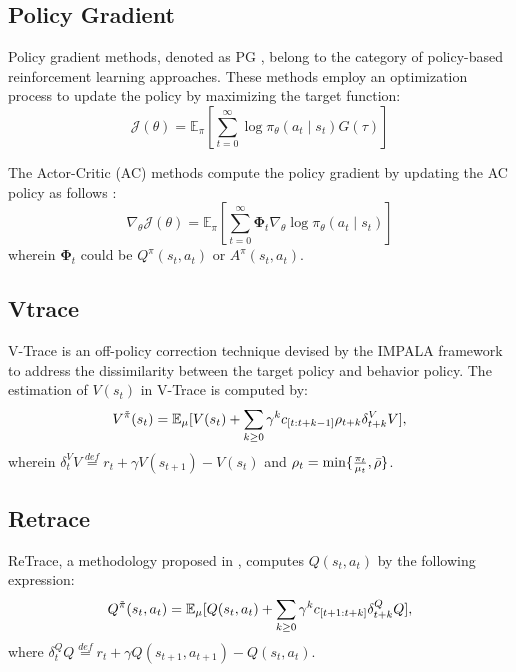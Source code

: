 \subsection{Policy Gradient}
\label{app: pg}

Policy gradient methods, denoted as PG \citep{williams1992simple,casa,entropy}, belong to the category of policy-based reinforcement learning approaches. These methods employ an optimization process to update the policy by maximizing the target function:
\begin{equation*}
    \mathcal{J} (\theta)=\mathbb{E}_{\pi}\left[\sum_{t=0}^{\infty} \log \pi_{\theta}\left(a_{t} \mid s_{t}\right) G(\tau)\right]
\end{equation*}


The Actor-Critic (AC) methods compute the policy gradient by updating the AC policy as follows \citep{sutton}:
\begin{equation*}
    \nabla_{\theta} \mathcal{J}(\theta)=\mathbb{E}_{\pi}\left[\sum_{t=0}^{\infty} \bm{\Phi}_{t} \nabla_{\theta} \log \pi_{\theta}\left(a_{t} \mid s_{t}\right)\right]
\end{equation*}
wherein $\bm{\Phi}_{t}$ could be  $Q^{\pi}\left(s_{t}, a_{t}\right)$ or $A^{\pi}\left(s_{t}, a_{t}\right)$. 

\subsection{Vtrace}
\label{app: vtrace}
V-Trace is an off-policy correction technique devised by the IMPALA framework \citep{impala} to address the dissimilarity between the target policy and behavior policy. The estimation of $V(s_t)$ in V-Trace is computed by:
\begin{equation*}
\label{Equ: vtrace}
    V^{\Tilde{\pi}} (s_t) 
        = \mathbb{E}_{\mu} [ 
        V(s_t) + \sum_{k \geq 0} \gamma^k 
     c_{[t:t+k-1]} \rho_{t+k}  \delta^{V}_{t+k} V ],
\end{equation*}
wherein $\delta^{V}_t V \overset{def}{=} r_t + \gamma V(s_{t+1}) - V(s_t)$ and $\rho_t = \min\{\frac{\pi_t}{\mu_t}, \Bar{\rho} \}$. 

\subsection{Retrace}
\label{app: retrace}
ReTrace, a methodology proposed in \citep{retrace}, computes $Q(s_t, a_t)$ by the following expression:
\begin{equation*}
\label{Equ: retrace}
    Q^{\Tilde{\pi}} (s_t, a_t) 
= \mathbb{E}_{\mu} [ Q(s_t, a_t) + \sum_{k \geq 0} \gamma^k 
c_{[t+1:t+k]} \delta^{Q}_{t+k} Q ],
\end{equation*}
where $\delta^{Q}_t Q \overset{def}{=} r_t + \gamma Q(s_{t+1}, a_{t+1}) - Q(s_t, a_t)$. 
\clearpage


